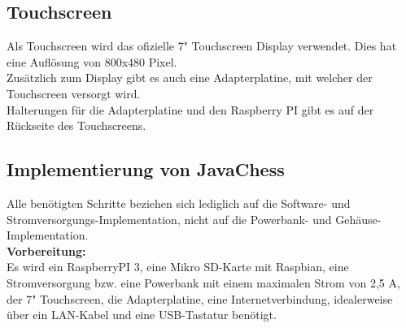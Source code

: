 \documentclass[12pt,a4paper]{article}
\begin{document}
\subsection{Touchscreen}

Als Touchscreen wird das ofizielle 7" Touchscreen Display verwendet. Dies hat eine Auflösung von 800x480 Pixel.\cite{RaspiScreen} \\
Zusätzlich zum Display gibt es auch eine Adapterplatine, mit welcher der Touchscreen versorgt wird. \\
Halterungen für die Adapterplatine und den Raspberry PI gibt es auf der Rückseite des Touchscreens.

\subsection{Implementierung von JavaChess}
\label{SUBSEC:IMPLEMENTJAVACHESS}

Alle benötigten Schritte beziehen sich lediglich auf die Software- und Stromversorgungs-Implementation, nicht auf die Powerbank- und Gehäuse-Implementation. \\[1ex]
\textbf{Vorbereitung:} \\[2ex]
Es wird ein RaspberryPI 3, eine Mikro SD-Karte mit Raspbian, eine Stromversorgung bzw. eine Powerbank mit einem maximalen Strom von 2,5 A, der 7" Touchscreen, die Adapterplatine, eine Internetverbindung, idealerweise über ein LAN-Kabel und eine USB-Tastatur benötigt. \\
\end{document}
